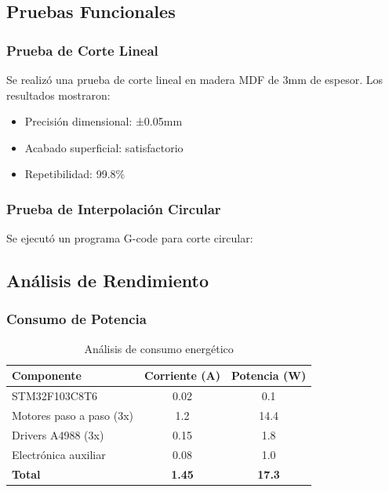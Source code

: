 \documentclass[12pt]{article}
\begin{document}
\subsection{Pruebas Funcionales}

\subsubsection{Prueba de Corte Lineal}

Se realizó una prueba de corte lineal en madera MDF de 3mm de espesor. Los resultados mostraron:
\begin{itemize}
    \item Precisión dimensional: ±0.05mm
    \item Acabado superficial: satisfactorio
    \item Repetibilidad: 99.8\%
\end{itemize}

\subsubsection{Prueba de Interpolación Circular}

Se ejecutó un programa G-code para corte circular:


\subsection{Análisis de Rendimiento}

\subsubsection{Consumo de Potencia}

\begin{table}[H]
\centering
\caption{Análisis de consumo energético}
\label{tab:consumo}
\begin{tabular}{|l|c|c|}
\hline
\textbf{Componente} & \textbf{Corriente (A)} & \textbf{Potencia (W)} \\
\hline
STM32F103C8T6 & 0.02 & 0.1 \\
Motores paso a paso (3x) & 1.2 & 14.4 \\
Drivers A4988 (3x) & 0.15 & 1.8 \\
Electrónica auxiliar & 0.08 & 1.0 \\
\hline
\textbf{Total} & \textbf{1.45} & \textbf{17.3} \\
\hline
\end{tabular}
\end{table}
\end{document}
